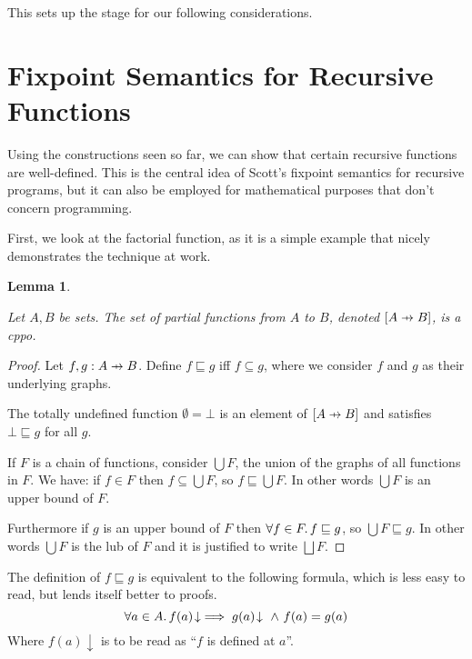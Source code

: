 \documentclass[a4paper]{article}
\newcommand{\below}{\sqsubseteq}
\newcommand{\lub}{\bigsqcup}
\newcommand{\pfun}{\mathrel{\ooalign{\hfil$\mapstochar\mkern5mu$\hfil\cr$\to$\cr}}}
\newcommand{\isdefined}{\!\downarrow}
\newtheorem{lemma}[definition]{Lemma}
\begin{document}
This sets up the stage for our following considerations.



\section{Fixpoint Semantics for Recursive Functions}
\label{secFixpointSemantics}

Using the constructions seen so far, we can show that certain recursive
functions are well-defined. This is the central idea of Scott's fixpoint
semantics for recursive programs, but it can also be employed for mathematical
purposes that don't concern programming.

First, we look at the factorial function, as it is a simple example that nicely
demonstrates the technique at work.

\begin{lemma} \label{lemPartialFunctionSpaceCppo}

Let $A, B$ be sets. The set of partial functions from $A$ to $B$, denoted
$[A \pfun B]$, is a cppo.

\end{lemma}

\begin{proof}

Let $f, g : A \pfun B$. Define $f \below g$ iff $f \subseteq g$, where we
consider $f$ and $g$ as their underlying graphs.

The totally undefined function $\emptyset = \bot$ is an element of $[A \pfun B]$
and satisfies $\bot \below g$ for all $g$.

If $F$ is a chain of functions, consider $\bigcup F$, the union of the graphs of
all functions in $F$. We have: if $f \in F$ then $f \subseteq \bigcup F$, so $f
\below \bigcup F$.  In other words $\bigcup F$ is an upper bound of $F$.

Furthermore if $g$ is an upper bound of $F$ then $\forall f \in F \ldotp f
\below g$, so $\bigcup F \below g$. In other words $\bigcup F$ is the lub of $F$
and it is justified to write $\lub F$.
\end{proof}


The definition of $f \below g$ is equivalent to the following formula, which is
less easy to read, but lends itself better to proofs.
\begin{equation*}
\forall a \in A \ldotp f(a)\isdefined \implies g(a)\isdefined\
\wedge\ f(a) = g(a)
\end{equation*}
Where $f(a)\isdefined$ is to be read as ``$f$ is defined at $a$''.
\end{document}
